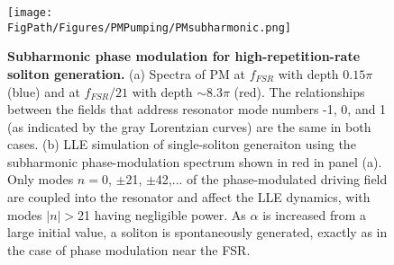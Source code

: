 \begin{figure}[htpb]
	\begin{center}
		\texttt{[image: \\FigPath/Figures/PMPumping/PMsubharmonic.png]}
	\end{center}
	\caption[Subharmonic phase modulation for high repetition-rate soliton generation]{\textbf{Subharmonic phase modulation for high-repetition-rate soliton generation.} (a) Spectra of PM at $f_{FSR}$ with depth $0.15\pi$ (blue) and at $f_{FSR}/21$ with depth $\sim$8.3$\pi$ (red). The relationships between the fields that address resonator mode numbers -1, 0, and 1 (as indicated by the gray Lorentzian curves) are the same in both cases. (b) LLE simulation of single-soliton generaiton using the subharmonic phase-modulation spectrum shown in red in panel (a). Only modes $n=0$, $\pm$21, $\pm$42,... of the phase-modulated driving field are coupled into the resonator and affect the LLE dynamics, with modes $|n|>$21 having negligible power. As $\alpha$ is increased from a large initial value, a soliton is spontaneously generated, exactly as in the case of phase modulation near the FSR.}
	\label{fig:PMsubharmonic}
\end{figure} 

